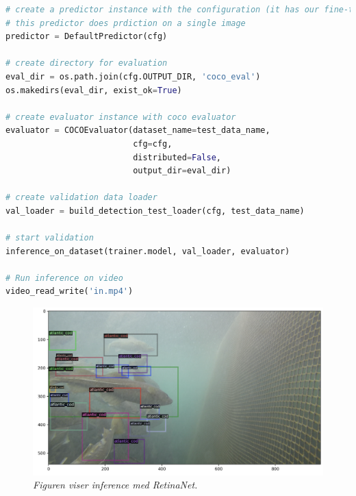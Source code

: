 \begin{lstlisting}[language=Python, caption=Inferens RetinaNet i inference.py]
# create a predictor instance with the configuration (it has our fine-tuned model)
# this predictor does prdiction on a single image
predictor = DefaultPredictor(cfg)

# create directory for evaluation
eval_dir = os.path.join(cfg.OUTPUT_DIR, 'coco_eval')
os.makedirs(eval_dir, exist_ok=True)

# create evaluator instance with coco evaluator
evaluator = COCOEvaluator(dataset_name=test_data_name,
                          cfg=cfg,
                          distributed=False,
                          output_dir=eval_dir)

# create validation data loader
val_loader = build_detection_test_loader(cfg, test_data_name)

# start validation 
inference_on_dataset(trainer.model, val_loader, evaluator)

# Run inference on video
video_read_write('in.mp4')
\end{lstlisting}

\begin{figure}
\begin{center} 
\includegraphics[scale=0.35]{figures/retinanet_cod}
\caption{\small \sl Figuren viser inference med RetinaNet. \label{fig:retinenet_inference}} 
\end{center} 
\end{figure} 

